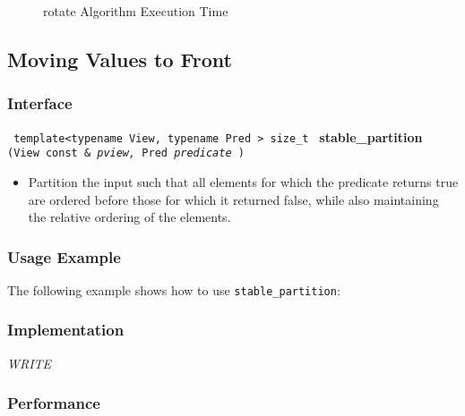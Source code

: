 \begin{figure}[p]
\caption{rotate Algorithm Execution Time}
\label{fig:rotate-alg-exec-exper}
\end{figure}


\subsection{Moving Values to Front} \label{sec-reord-stab_part}

\subsubsection{Interface} %

\noindent
\texttt{%
template<typename View, typename Pred >
\newline
size\_t 
}
\newline
\textbf{stable\_partition}%
\texttt{%
(View const \&
\textit{pview,}%
Pred 
\textit{predicate}%
)
}

\begin{itemize}
\item
Partition the input such that all elements for which the predicate returns true are ordered before those for which it returned false, while also maintaining the relative ordering of the elements. 
\end{itemize}

\subsubsection{Usage Example} %

The following example shows how to use \texttt{stable\_partition}:

 
\subsubsection{Implementation} %

\textit{WRITE}

\subsubsection{Performance} %

